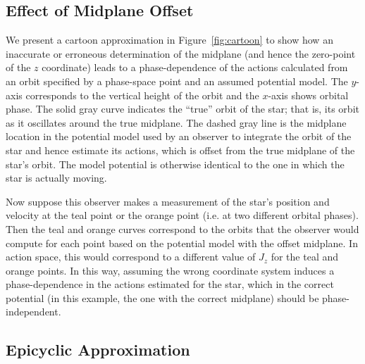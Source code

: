 \documentclass[twocolumn]{aastex62}
\begin{document}
\subsection{Effect of Midplane Offset} \label{ssec:cartoon}
We present a cartoon approximation in Figure~\ref{fig:cartoon} to show how an
inaccurate or erroneous determination of the midplane (and hence the
zero-point of the $z$ coordinate) leads to a phase-dependence of the actions
calculated from an orbit specified by a phase-space point and an assumed
potential model. The $y$-axis corresponds to the vertical height of the orbit
and the $x$-axis shows orbital phase. The solid gray curve indicates the
``true'' orbit of the star; that is, its orbit as it oscillates around the
true midplane. The dashed gray line is the midplane location in the potential
model used by an observer to integrate the orbit of the star and hence
estimate its actions, which is offset from the true midplane of the star's
orbit. The model potential is otherwise identical to the one in which the star
is actually moving.

Now suppose this observer makes a measurement of the star's position and
velocity at the teal point or the orange point (i.e. at two different orbital
phases). Then the teal and orange curves correspond to the orbits that the
observer would compute for each point based on the potential model with the
offset midplane. In action space, this would correspond to a different value
of $J_z$ for the teal and orange points. In this way, assuming the wrong
coordinate system induces a phase-dependence in the actions estimated for the
star, which in the correct potential (in this example, the one with the
correct midplane) should be phase-independent.

\subsection{Epicyclic Approximation} \label{ssec:epi_action}
\end{document}
